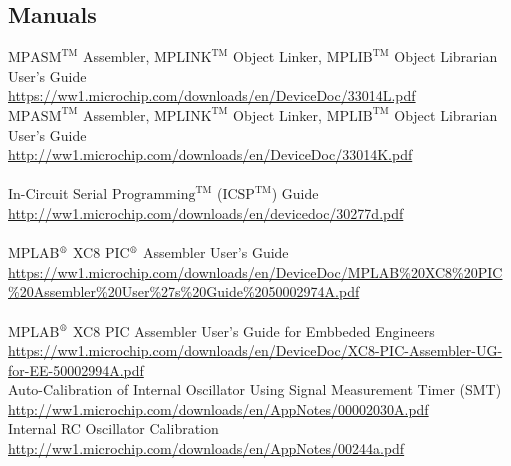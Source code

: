 \documentclass[12pt, letterpaper]{article}
\begin{document}
\subsection{Manuals}
$\text{MPASM}^{\text{TM}}$ Assembler, $\text{MPLINK}^{\text{TM}}$ Object Linker, $\text{MPLIB}^{\text{TM}}$ Object Librarian User's Guide\\
\url{https://ww1.microchip.com/downloads/en/DeviceDoc/33014L.pdf}\\

\noindent $\text{MPASM}^{\text{TM}}$ Assembler, $\text{MPLINK}^{\text{TM}}$ Object Linker, $\text{MPLIB}^{\text{TM}}$ Object Librarian User's Guide\\
\url{http://ww1.microchip.com/downloads/en/DeviceDoc/33014K.pdf}\\
\\
\noindent In-Circuit Serial $\text{Programming}^{\text{TM}}$ ($\text{ICSP}^{\text{TM}}$) Guide\\
\url{http://ww1.microchip.com/downloads/en/devicedoc/30277d.pdf}\\
\\
MPLAB$^\text{\textregistered}$ XC8 PIC$^\text{\textregistered}$ Assembler User's Guide\\
\url{https://ww1.microchip.com/downloads/en/DeviceDoc/MPLAB%20XC8%20PIC%20Assembler%20User%27s%20Guide%2050002974A.pdf}\\
\\
MPLAB$^\text{\textregistered}$ XC8 PIC Assembler User's Guide for Embbeded Engineers\\
\url{https://ww1.microchip.com/downloads/en/DeviceDoc/XC8-PIC-Assembler-UG-for-EE-50002994A.pdf}\\

\noindent Auto-Calibration of Internal Oscillator Using Signal Measurement Timer (SMT)\\
\url{http://ww1.microchip.com/downloads/en/AppNotes/00002030A.pdf}\\

\noindent Internal RC Oscillator Calibration\\
\url{http://ww1.microchip.com/downloads/en/AppNotes/00244a.pdf}\\
\end{document}
